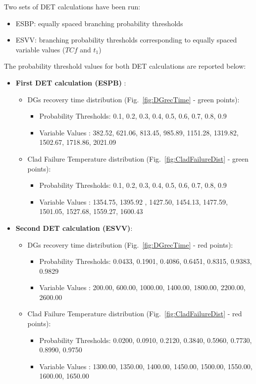 \documentclass{mc2013}
\begin{document}
Two sets of DET calculations have been run:
\vspace{-5mm}
\begin{itemize}
    \item ESBP: equally spaced branching probability thresholds 
    \item ESVV: branching probability thresholds corresponding to equally spaced variable values ($TC{f}$ and $t_{1}$)
\end{itemize}
\vspace{-5mm}
The probability threshold values for both DET calculations are reported below:
\vspace{-5mm}
 \begin{itemize}
   \item \textbf{First DET calculation (ESPB)} :
   \begin{itemize}
       \item DGs recovery time distribution (Fig.~\ref{fig:DGrecTime} - green points): 
       \begin{itemize} 
            \item Probability Thresholds: 0.1, 0.2, 0.3, 0.4, 0.5, 0.6, 0.7, 0.8, 0.9
            \item Variable Values           : 382.52, 621.06, 813.45, 985.89, 1151.28, 1319.82, 1502.67, 1718.86, 2021.09 
       \end{itemize}
       \item Clad Failure Temperature distribution (Fig.~\ref{fig:CladFailureDist} - green points): 
       \begin{itemize} 
            \item Probability Thresholds: 0.1, 0.2, 0.3, 0.4, 0.5, 0.6, 0.7, 0.8, 0.9
            \item Variable Values           : 1354.75, 1395.92 , 1427.50, 1454.13, 1477.59, 1501.05, 1527.68, 1559.27, 1600.43 
       \end{itemize}
    \end{itemize}
   \item \textbf{Second DET calculation (ESVV)}:
   \begin{itemize}
       \item DGs recovery time distribution (Fig.~\ref{fig:DGrecTime} - red points): 
       \begin{itemize} 
            \item Probability Thresholds: 0.0433, 0.1901, 0.4086, 0.6451, 0.8315, 0.9383, 0.9829
            \item Variable Values           : 200.00, 600.00, 1000.00, 1400.00, 1800.00, 2200.00, 2600.00 
       \end{itemize}
       \item Clad Failure Temperature distribution (Fig.~\ref{fig:CladFailureDist} - red points): 
       \begin{itemize} 
            \item Probability Thresholds: 0.0200, 0.0910, 0.2120, 0.3840, 0.5960, 0.7730, 0.8990, 0.9750
            \item Variable Values           : 1300.00, 1350.00, 1400.00, 1450.00, 1500.00, 1550.00, 1600.00, 1650.00 
       \end{itemize}
    \end{itemize}
\end{itemize}
\end{document}
